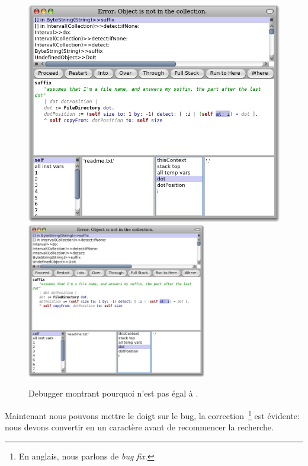 \documentclass[a4paper,10pt,twoside]{book}
\begin{document}
\begin{figure}[btp]
	\begin{center}
	\ifluluelse
		{\includegraphics[width=\textwidth]{dotIsAString}}
		{\includegraphics[width=0.7\textwidth]{dotIsAString}}
	\end{center}
	\caption{Debugger montrant pourquoi  n'est pas égal à .}
\end{figure}

Maintenant nous pouvons mettre le doigt sur le bug, 
la correction~\footnote{En anglais, nous parlons de \emph{bug fix}.} 
est évidente: nous devons convertir  en un caractère avant de 
recommencer la recherche.
\end{document}
